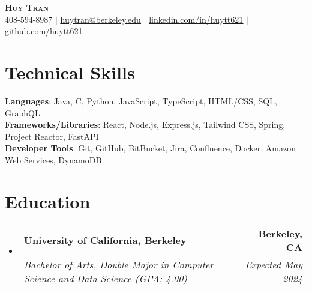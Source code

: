 \documentclass[letterpaper,11pt]{article}
\makeatletter
\newcommand{\resumeSubheading}[4]{
  \vspace{-2pt}\item
    \begin{tabular*}{0.97\textwidth}[t]{l@{\extracolsep{\fill}}r}
      \textbf{#1} & #2 \\
      \textit{\small#3} & \textit{\small #4} \\
    \end{tabular*}\vspace{-7pt}
}
\newcommand{\resumeSubHeadingListStart}{\begin{itemize}[leftmargin=0.15in, label={}]}
\newcommand{\resumeSubHeadingListEnd}{\end{itemize}}
\makeatother
\begin{document}

\begin{center}
    \textbf{\Huge \scshape Huy Tran} \\ \vspace{1pt}
    \small 408-594-8987 $|$ \href{mailto:huytran@berkeley.edu}{\underline{huytran@berkeley.edu}} $|$ 
    \href{https://linkedin.com/in/huytt621}{\underline{linkedin.com/in/huytt621}} $|$
    \href{https://github.com/huytt621}{\underline{github.com/huytt621}}
\end{center}


%
\section{\textbf{Technical Skills}}
 \begin{itemize}[leftmargin=0.15in, label={}]
    \small{\item{
     \textbf{Languages}{: Java, C, Python, JavaScript, TypeScript, HTML/CSS, SQL, GraphQL} \\
     \textbf{Frameworks/Libraries}{: React, Node.js, Express.js, Tailwind CSS, Spring, Project Reactor, FastAPI} \\
     \textbf{Developer Tools}{: Git, GitHub, BitBucket, Jira, Confluence, Docker, Amazon Web Services, DynamoDB}
    }}
 \end{itemize}


\section{\textbf{Education}}
  \resumeSubHeadingListStart
    \resumeSubheading
      {University of California, Berkeley}{\textbf{Berkeley, CA}}
      {Bachelor of Arts, Double Major in Computer Science and Data Science (GPA: 4.00)}{Expected May 2024}

  \resumeSubHeadingListEnd
\end{document}

